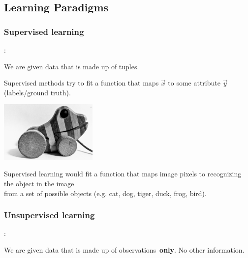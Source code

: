 \subsection{Learning Paradigms}

\subsubsection{Supervised learning}

\begin{frame}{\subsecname:~\subsubsecname}

We are given data that is made up of tuples.

Supervised methods try to fit a function that maps $\vec x$ to some attribute $\vec y$ (labels/ground truth).

\begin{center}
	\includegraphics[height=3cm]{img/tigerente}
\end{center}

Supervised learning would fit a function that maps image pixels to recognizing the object in the image\\
from a set of possible objects (e.g. cat, dog, tiger, duck, frog, bird).
    
\end{frame}

\subsubsection{Unsupervised learning}

\begin{frame}{\subsecname: \subsubsecname}

We are given data that is made up of observations\pause~\textbf{only}. No other information.


\end{frame}

